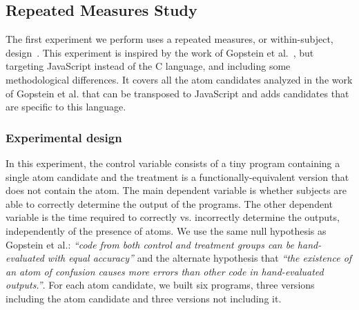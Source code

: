 \subsection{Repeated Measures Study}\label{sec:meth:replication}

The first experiment we perform uses a repeated measures, or within-subject, design~\cite{Keselman:2001:ARM}. This experiment is inspired by the work of Gopstein et al.~\cite{DBLP:conf/sigsoft/GopsteinIYDZYC17}, but targeting JavaScript instead of the C language, and including some methodological differences. It covers all the atom candidates analyzed in the work of Gopstein et al. that can be transposed to JavaScript and adds candidates that are specific to this language.

\subsubsection*{Experimental design} 

In this experiment, the control variable consists of a tiny program containing a single atom candidate and the treatment is a functionally-equivalent version that does not contain the atom. The main dependent variable is whether subjects are able to correctly determine the output of the programs. The other dependent variable is the time required to correctly vs. incorrectly determine the outputs, independently of the presence of atoms. We use the same null hypothesis as Gopstein et al.: \textit{``code from both control and treatment groups can be hand-evaluated with equal accuracy''} and the alternate hypothesis that \textit{``the existence of an atom of confusion causes more errors than other code in hand-evaluated outputs.''}. For each atom candidate, we built six programs, three versions including the atom candidate and three versions not including it. 

